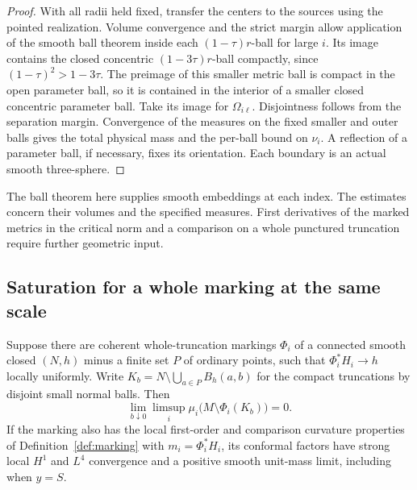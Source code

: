 \begin{proof}
With all radii held fixed, transfer the centers to the sources
using the pointed realization. Volume convergence and the
strict margin allow application of the smooth ball theorem
inside each \((1-\tau)r\)-ball for large \(i\). Its image
contains the closed concentric \((1-3\tau)r\)-ball compactly,
since \((1-\tau)^2>1-3\tau\). The preimage of this smaller
metric ball is compact in the open parameter ball, so it is
contained in the interior of a smaller closed concentric
parameter ball. Take its image for \(\Omega_{i\ell}\).
Disjointness follows from the separation margin. Convergence
of the measures on the fixed smaller and outer balls gives
the total physical mass and the per-ball bound on \(\nu_i\).
A reflection of a parameter ball, if necessary, fixes its
orientation. Each boundary is an actual smooth three-sphere.
\end{proof}

The ball theorem here supplies smooth embeddings at each index.
The estimates concern their volumes and the specified measures.
First derivatives of the marked metrics in the critical norm and
a comparison on a whole punctured truncation require further
geometric input.

\subsection{Saturation for a whole marking at the same scale}

\begin{proposition}
\label{vol:normalized-marking}
Suppose there are coherent whole-truncation markings
\(\Phi_i\) of a connected smooth closed \((N,h)\) minus a
finite set \(P\) of ordinary points, such that
\(\Phi_i^*H_i\to h\) locally uniformly. Write
\(K_b=N\setminus\bigcup_{a\in P}B_h(a,b)\) for the compact
truncations by disjoint small normal balls. Then
\begin{equation}
 \lim_{b\downarrow0}\limsup_i
 \mu_i\bigl(M\setminus\Phi_i(K_b)\bigr)=0 .
 \label{vol:exit-saturation}
\end{equation}
If the marking also has the local first-order and comparison
curvature properties of Definition~\ref{def:marking} with
\(m_i=\Phi_i^*H_i\), its conformal factors have strong local
\(H^1\) and \(L^4\) convergence and a positive smooth unit-mass
limit, including when \(y=S\).
\end{proposition}

